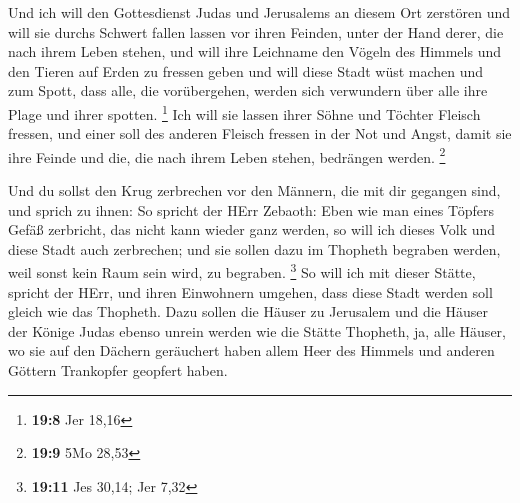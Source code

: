  Und ich will den Gottesdienst Judas und Jerusalems an
diesem Ort zerstören und will sie durchs Schwert fallen lassen vor ihren
Feinden, unter der Hand derer, die nach ihrem Leben stehen, und will
ihre Leichname den Vögeln des Himmels und den Tieren auf Erden zu
fressen geben  und will diese Stadt wüst machen und zum
Spott, dass alle, die vorübergehen, werden sich verwundern über alle
ihre Plage und ihrer spotten. \footnote{\textbf{19:8} Jer 18,16}
 Ich will sie lassen ihrer Söhne und Töchter Fleisch
fressen, und einer soll des anderen Fleisch fressen in der Not und
Angst, damit sie ihre Feinde und die, die nach ihrem Leben stehen,
bedrängen werden. \footnote{\textbf{19:9} 5Mo 28,53}

 Und du sollst den Krug zerbrechen vor den Männern, die mit
dir gegangen sind,  und sprich zu ihnen: So spricht der
HErr Zebaoth: Eben wie man eines Töpfers Gefäß zerbricht, das nicht kann
wieder ganz werden, so will ich dieses Volk und diese Stadt auch
zerbrechen; und sie sollen dazu im Thopheth begraben werden, weil sonst
kein Raum sein wird, zu begraben. \footnote{\textbf{19:11} Jes 30,14;
  Jer 7,32}  So will ich mit dieser Stätte, spricht der
HErr, und ihren Einwohnern umgehen, dass diese Stadt werden soll gleich
wie das Thopheth.  Dazu sollen die Häuser zu Jerusalem und
die Häuser der Könige Judas ebenso unrein werden wie die Stätte
Thopheth, ja, alle Häuser, wo sie auf den Dächern geräuchert haben allem
Heer des Himmels und anderen Göttern Trankopfer geopfert haben.

